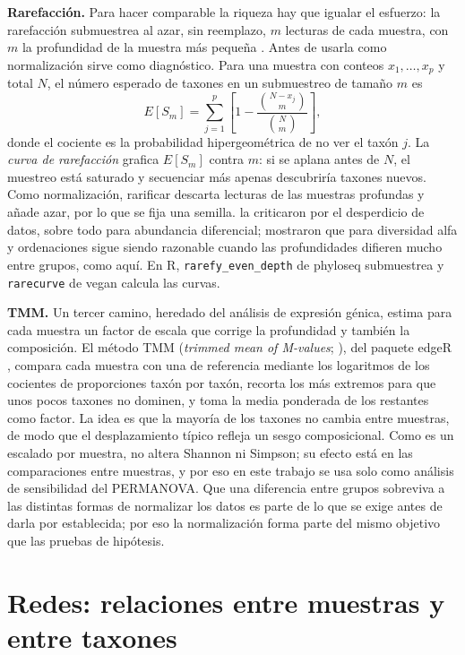 \textbf{Rarefacción.} Para hacer comparable la riqueza hay que igualar el esfuerzo: la rarefacción
submuestrea al azar, sin reemplazo, $m$ lecturas de cada muestra, con $m$ la profundidad de la muestra
más pequeña \citep{hurlbert1971nonconcept}. Antes de usarla como normalización sirve como diagnóstico.
Para una muestra con conteos $x_1, \dots, x_p$ y total $N$, el número esperado de taxones en un
submuestreo de tamaño $m$ es
\begin{equation}
E[S_m] = \sum_{j=1}^{p} \left[ 1 - \frac{\binom{N - x_j}{m}}{\binom{N}{m}} \right],
\label{eq:rarefaccion}
\end{equation}
donde el cociente es la probabilidad hipergeométrica de no ver el taxón $j$. La \emph{curva de
rarefacción} grafica $E[S_m]$ contra $m$: si se aplana antes de $N$, el muestreo está saturado y
secuenciar más apenas descubriría taxones nuevos. Como normalización, rarificar descarta lecturas de
las muestras profundas y añade azar, por lo que se fija una semilla. \citet{mcmurdie2014waste} la
criticaron por el desperdicio de datos, sobre todo para abundancia diferencial;
\citet{weiss2017normalization} mostraron que para diversidad alfa y ordenaciones sigue siendo
razonable cuando las profundidades difieren mucho entre grupos, como aquí. En R,
\texttt{rarefy\_even\_depth} de phyloseq submuestrea y \texttt{rarecurve} de vegan calcula las curvas.

\textbf{TMM.} Un tercer camino, heredado del análisis de expresión génica, estima para cada muestra
un factor de escala que corrige la profundidad y también la composición. El método TMM
(\emph{trimmed mean of M-values}; \citealp{robinson2010scaling}), del paquete edgeR
\citep{robinson2010edger}, compara cada muestra con una de referencia mediante los logaritmos de los
cocientes de proporciones taxón por taxón, recorta los más extremos para que unos pocos taxones no
dominen, y toma la media ponderada de los restantes como factor. La idea es que la mayoría de los
taxones no cambia entre muestras, de modo que el desplazamiento típico refleja un sesgo composicional.
Como es un escalado por muestra, no altera Shannon ni Simpson; su efecto está en las comparaciones
entre muestras, y por eso en este trabajo se usa solo como análisis de sensibilidad del PERMANOVA.
Que una diferencia entre grupos sobreviva a las distintas formas de normalizar los datos es parte de
lo que se exige antes de darla por establecida; por eso la normalización forma parte del mismo
objetivo que las pruebas de hipótesis.

\section[Redes de muestras y de coocurrencia]{Redes: relaciones entre muestras y entre taxones}
\label{sec:redes}

